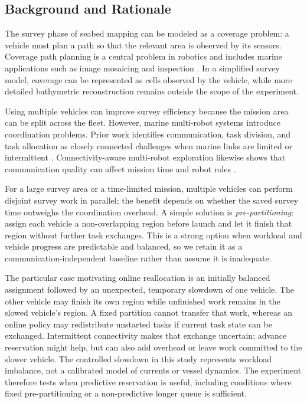 \subsection{Background and Rationale}
The survey phase of seabed mapping can be modeled as a coverage problem: a vehicle must plan a path so that the relevant area is observed by its sensors. Coverage path planning is a central problem in robotics and includes marine applications such as image mosaicing and inspection \cite{galceran2013coverage}. In a simplified survey model, coverage can be represented as cells observed by the vehicle, while more detailed bathymetric reconstruction remains outside the scope of the experiment.

Using multiple vehicles can improve survey efficiency because the mission area can be split across the fleet. However, marine multi-robot systems introduce coordination problems. Prior work identifies communication, task division, and task allocation as closely connected challenges when marine links are limited or intermittent \cite{martorell2024coordination}. Connectivity-aware multi-robot exploration likewise shows that communication quality can affect mission time and robot roles \cite{abuaisheh2022cara}.

For a large survey area or a time-limited mission, multiple vehicles can perform disjoint survey work in parallel; the benefit depends on whether the saved survey time outweighs the coordination overhead. A simple solution is \emph{pre-partitioning}: assign each vehicle a non-overlapping region before launch and let it finish that region without further task exchanges. This is a strong option when workload and vehicle progress are predictable and balanced, so we retain it as a communication-independent baseline rather than assume it is inadequate.

The particular case motivating online reallocation is an initially balanced assignment followed by an unexpected, temporary slowdown of one vehicle. The other vehicle may finish its own region while unfinished work remains in the slowed vehicle's region. A fixed partition cannot transfer that work, whereas an online policy may redistribute unstarted tasks if current task state can be exchanged. Intermittent connectivity makes that exchange uncertain; advance reservation might help, but can also add overhead or leave work committed to the slower vehicle. The controlled slowdown in this study represents workload imbalance, not a calibrated model of currents or vessel dynamics. The experiment therefore tests when predictive reservation is useful, including conditions where fixed pre-partitioning or a non-predictive longer queue is sufficient.

